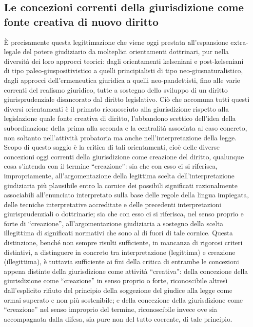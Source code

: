 \subsection{Le concezioni correnti della giurisdizione come fonte creativa di nuovo diritto}
È precisamente questa legittimazione che viene oggi prestata all’espansione extra-legale del potere giudiziario da molteplici orientamenti dottrinari, pur nella diversità dei loro approcci teorici: dagli orientamenti kelseniani e post-kelseniani di tipo paleo-giuspositivistico a quelli principialisti di tipo neo-giusnaturalistico, dagli approcci dell’ermeneutica giuridica a quelli neo-pandettisti, fino alle varie correnti del realismo giuridico, tutte a sostegno dello sviluppo di un diritto giurisprudenziale disancorato dal diritto legislativo. Ciò che accomuna tutti questi diversi orientamenti è il primato riconosciuto alla giurisdizione rispetto alla legislazione quale fonte creativa di diritto, l’abbandono scettico dell’idea della subordinazione della prima alla seconda e la centralità associata al caso concreto, non soltanto nell’attività probatoria ma anche nell’interpretazione della legge.
Scopo di questo saggio è la critica di tali orientamenti, cioè delle diverse concezioni oggi correnti della giurisdizione come creazione del diritto, qualunque cosa s’intenda con il termine “creazione”: sia che con esso ci si riferisca, impropriamente, all’argomentazione della legittima scelta dell’interpretazione giudiziaria più plausibile entro la cornice dei possibili significati razionalmente associabili all’enunciato interpretato sulla base delle regole della lingua impiegata, delle tecniche interpretative accreditate e delle precedenti interpretazioni giurisprudenziali o dottrinarie; sia che con esso ci si riferisca, nel senso proprio e forte di “creazione”, all’argomentazione giudiziaria a sostegno della scelta illegittima di significati normativi che sono al di fuori di tale cornice. Questa distinzione, benché non sempre risulti sufficiente, in mancanza di rigorosi criteri distintivi, a distinguere in concreto tra interpretazione (legittima) e creazione (illegittima), è tuttavia sufficiente ai fini della critica di entrambe le concezioni appena distinte della giurisdizione come attività “creativa”: della concezione della giurisdizione come “creazione” in senso proprio o forte, riconoscibile altresì dall’esplicito rifiuto del principio della soggezione del giudice alla legge come ormai superato e non più sostenibile; e della concezione della giurisdizione come “creazione” nel senso improprio del termine, riconoscibile invece ove sia accompagnata dalla difesa, sia pure non del tutto coerente, di tale principio.
